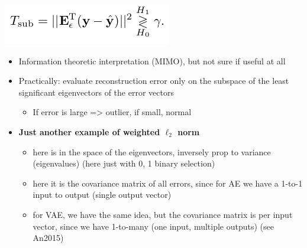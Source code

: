 \documentclass[
  letterpaper,
  DIV=11,
  numbers=noendperiod]{scrartcl}
\providecommand{\tightlist}{%
  \setlength{\itemsep}{0pt}\setlength{\parskip}{0pt}}\usepackage{longtable,booktabs,array}
\begin{document}
\includegraphics{img/2023-02-27-10-13-03.png}

\begin{itemize}
\tightlist
\item
  Information theoretic interpretation (MIMO), but not sure if useful at
  all
\item
  Practically: evaluate reconstruction error only on the subspace of the
  least significant eigenvectors of the error vectors

  \begin{itemize}
  \tightlist
  \item
    If error is large =\textgreater{} outlier, if small, normal
  \end{itemize}
\item
  \textbf{Just another example of weighted \(\ell_2\) norm}

  \begin{itemize}
  \tightlist
  \item
    here is in the space of the eigenvectors, inversely prop to variance
    (eigenvalues) (here just with 0, 1 binary selection)
  \item
    here it is the covariance matrix of all errors, since for AE we have
    a 1-to-1 input to output (single output vector)
  \item
    for VAE, we have the same idea, but the covariance matrix is per
    input vector, since we have 1-to-many (one input, multiple outputs)
    (see An2015)
  \end{itemize}
\end{itemize}
\end{document}
